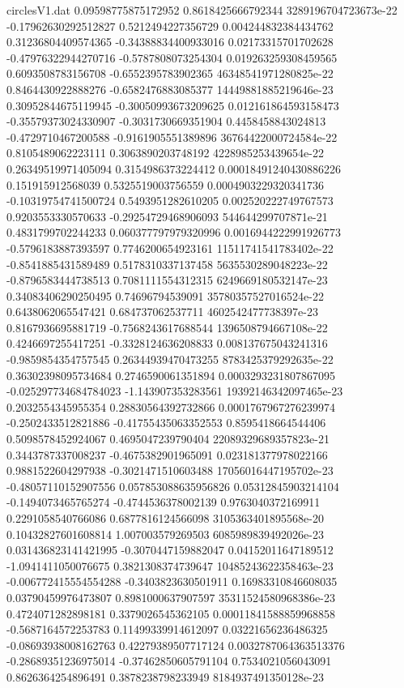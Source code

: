 \begin{filecontents}{circlesV1.dat}
0.09598775875172952	0.8618425666792344	3289196704723673e-22
-0.17962630292512827	0.5212494227356729	0.004244832384434762
0.31236804409574365	-0.34388834400933016	0.02173315701702628
-0.47976322944270716	-0.5787808073254304	0.019263259308459565
0.6093508783156708	-0.6552395783902365	46348541971280825e-22
0.8464430922888276	-0.6582476883085377	14449881885219646e-23
0.30952844675119945	-0.30050993673209625	0.012161864593158473
-0.35579373024330907	-0.3031730669351904	0.4458458843024813
-0.4729710467200588	-0.9161905551389896	36764422000724584e-22
0.8105489062223111	0.3063890203748192	4228985253439654e-22
0.26349519971405094	0.3154986373224412	0.00018491240430886226
0.151915912568039	0.5325519003756559	0.0004903229320341736
-0.10319754741500724	0.5493951282610205	0.002520222749767573
0.9203553330570633	-0.29254729468906093	544644299707871e-21
0.4831799702244233	0.060377797979320996	0.0016944222991926773
-0.5796183887393597	0.7746200654923161	11511741541783402e-22
-0.8541885431589489	0.5178310337137458	5635530289048223e-22
-0.8796583444738513	0.7081111554312315	6249669180532147e-23
0.34083406290250495	0.74696794539091	35780357527016524e-22
0.6438062065547421	0.684737062537711	4602542477738397e-23
0.8167936695881719	-0.7568243617688544	1396508794667108e-22
0.4246697255417251	-0.3328124636208833	0.008137675043241316
-0.9859854354757545	0.26344939470473255	8783425379292635e-22
0.36302398095734684	0.2746590061351894	0.0003293231807867095
-0.025297734684784023	-1.143907353283561	19392146342097465e-23
0.2032554345955354	0.28830564392732866	0.0001767967276239974
-0.2502433512821886	-0.41755435063352553	0.8595418664544406
0.5098578452924067	0.4695047239790404	22089329689357823e-21
0.3443787337008237	-0.4675382901965091	0.023181377978022166
0.9881522604297938	-0.3021471510603488	17056016447195702e-23
-0.48057110152907556	0.057853088635956826	0.05312845903214104
-0.1494073465765274	-0.4744536378002139	0.9763040372169911
0.2291058540766086	0.6877816124566098	3105363401895568e-20
0.10432827601608814	1.007003579269503	6085989839492026e-23
0.031436823141421995	-0.3070447159882047	0.04152011647189512
-1.0941411050076675	0.3821308374739647	10485243622358463e-23
-0.006772415554554288	-0.3403823630501911	0.16983310846608035
0.03790459976473807	0.8981000637907597	35311524580968386e-23
0.4724071282898181	0.3379026545362105	0.00011841588859968858
-0.5687164572253783	0.11499339914612097	0.03221656236486325
-0.08693938008162763	0.42279389507717124	0.0032787064363513376
-0.28689351236975014	-0.37462850605791104	0.7534021056043091
0.8626364254896491	0.3878238798233949	8184937491350128e-23

\end{filecontents}
